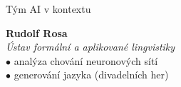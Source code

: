 \documentclass[handout,aspectratio=169,dvipsnames]{beamer}
\begin{document}
\begin{frame}{Tým AI v kontextu}
    \hspace{40pt}\begin{minipage}{70pt}
    \end{minipage}\begin{minipage}{250pt}
        \textbf{Rudolf Rosa} \\
        \textit{Ústav formální a aplikované lingvistiky} \\
        \quad$\bullet$ analýza chování neuronových sítí \\
        \quad$\bullet$ generování jazyka (divadelních her)
    \end{minipage}

    \vspace{10pt}


\end{frame}
\end{document}
